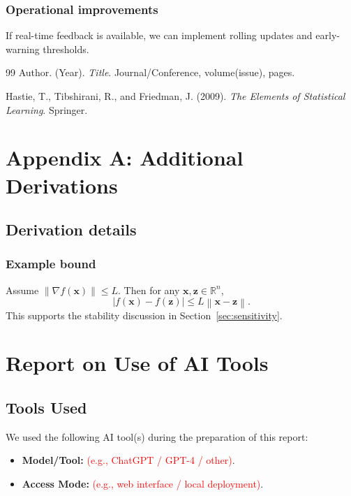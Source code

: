 \documentclass[12pt]{article}
\newcommand{\R}{\mathbb{R}}
\newcommand{\vect}[1]{\boldsymbol{#1}}
\newcommand{\norm}[1]{\left\lVert #1 \right\rVert}
\begin{document}
\subsubsection{Operational improvements}
If real-time feedback is available, we can implement rolling updates and early-warning thresholds.

\clearpage

\begin{thebibliography}{99}
  Author. (Year). \textit{Title}. Journal/Conference, volume(issue), pages.

  Hastie, T., Tibshirani, R., and Friedman, J. (2009).
  \textit{The Elements of Statistical Learning}. Springer.
\end{thebibliography}

\appendix
\section{Appendix A: Additional Derivations}
\subsection{Derivation details}
\subsubsection{Example bound}
Assume $\norm{\nabla f(\vect{x})}\le L$. Then for any $\vect{x},\vect{z}\in\R^n$,
\[
  |f(\vect{x})-f(\vect{z})|\le L\norm{\vect{x}-\vect{z}}.
\]
This supports the stability discussion in Section~\ref{sec:sensitivity}.
\clearpage
\section*{Report on Use of AI Tools}

\subsection*{Tools Used}
We used the following AI tool(s) during the preparation of this report:
\begin{itemize}
  \item \textbf{Model/Tool:} \textcolor{red}{(e.g., ChatGPT / GPT-4 / other)}.
  \item \textbf{Access Mode:} \textcolor{red}{(e.g., web interface / local deployment)}.
\end{itemize}
\end{document}
